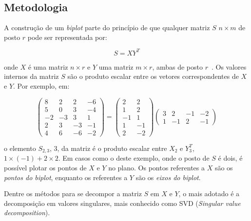 \subsection{Metodologia}

A construção de um \emph{biplot} parte do princípio de que qualquer
matriz $S$ $n \times m$ de posto $r$  pode
ser representada por:

\begin{equation}
    S = XY^T
\end{equation}

onde $X$ é uma matriz $n \times r$ e $Y$ uma matriz $m
\times r$, ambas de posto $r$~\cite{Gabriel1971}. Os valores
internos da matriz $S$ são o produto escalar entre os
vetores correspondentes de $X$ e $Y$. Por exemplo, em:

\begin{equation}
    \left( \begin{array}{rrrr}
        8 &  2 &  2 & -6 \\
        5 &  0 &  3 & -4 \\
       -2 & -3 &  3 &  1 \\
            2 &  3 & -3 & -1 \\
        4 &  6 & -6 & -2\end{array}
\right) = \left( \begin{array}{rr}
         2 & 2 \\
         1 & 2 \\
        -1 & 1 \\
         1 & -1 \\
         2 & -2\end{array} 
\right) \left( \begin{array}{rrrr}
        3 &  2 &-1 & -2 \\
    1 & -1 & 2 & -1 \end{array} 
\right)
\end{equation}

o elemento $S_{2,3}$, 3, da matriz é o
produto escalar entre $X_2$ e $Y^T_3$, $1 \times \left( -1
\right) + 2 \times 2$. Em casos como o deste
exemplo, onde o posto de $S$ é dois, é possível plotar os
pontos de $X$ e $Y$ no plano. Os pontos referentes a $X$ são
os \emph{pontos do biplot}, enquanto os referentes a $Y$ são
os \emph{eixos do biplot}.

Dentre os métodos para se decompor a matriz $S$ em $X$ e
$Y$, o mais adotado é a decomposição em valores singulares,
mais conhecido como SVD (\emph{Singular value
decomposition}).

